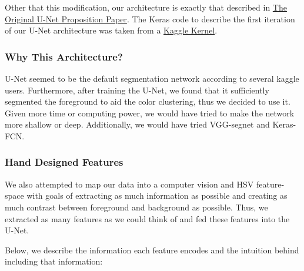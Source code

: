 \documentclass[paper=letter, fontsize=12pt]{article}
\numberwithin{equation}{section} %
\numberwithin{figure}{section} %
\numberwithin{table}{section} %
\begin{document}
Other that this
modification, our architecture is exactly that described in
\href{https://arxiv.org/pdf/1505.04597.pdf}{The Original U-Net Proposition
Paper}.  The Keras code to describe the first iteration of our U-Net
architecture was taken from a
\href{https://www.depends-on-the-definition.com/unet-keras-segmenting-images/}{Kaggle Kernel}.

\subsubsection{Why This Architecture?}
U-Net seemed to be the default segmentation network according to several kaggle users.
Furthermore, after training the U-Net, we found that it sufficiently segmented the foreground
to aid the color clustering, thus we decided to use it. Given more time or computing power, we
would have tried to make the network more shallow or deep. Additionally, we would have tried
VGG-segnet and Keras-FCN.

\subsubsection{Hand Designed Features}

We also attempted to map our data into a computer vision and HSV feature-space
with goals of extracting as much information as possible and creating as much
contrast between foreground and background as possible. Thus, we extracted
as many features as we could think of and fed these features into the U-Net.

Below, we describe the information each feature encodes and the intuition behind
including that information:
\end{document}
